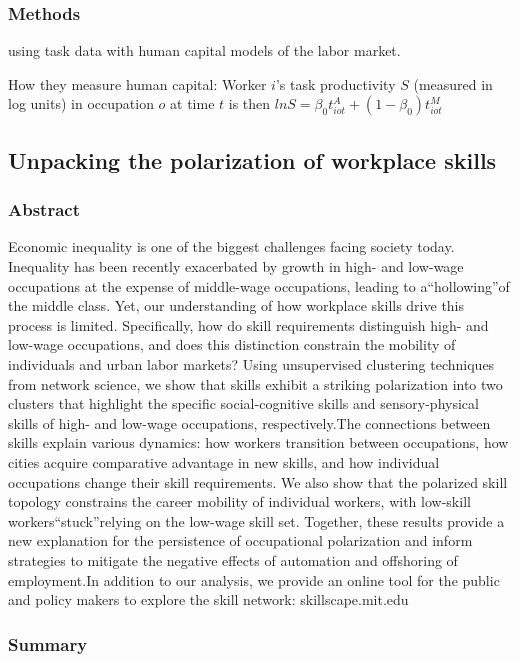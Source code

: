 \documentclass[12pt]{article}
\begin{document}
\subsubsection*{Methods}

using task data with human capital models of the labor market.

How they measure human capital:  Worker $i$'s task productivity $S$ (measured in log units) in occupation $o$ at time $t$ is then $ln{S} = \beta_0t^{A}_{iot} + (1-\beta_0)t^M_{iot}$



\subsection*{Unpacking the polarization of workplace skills\cite{unpacking_the_polarization}}

\subsubsection*{Abstract}
Economic inequality is one of the biggest challenges facing society today. Inequality has been recently exacerbated by growth in high- and low-wage occupations at the expense of middle-wage occupations, leading to a“hollowing”of the middle class. Yet, our understanding of how workplace skills drive this process is limited. Specifically, how do skill requirements distinguish high- and low-wage occupations, and does this distinction constrain the mobility of individuals and urban labor markets? Using unsupervised clustering techniques from network science, we show that skills exhibit a striking polarization into two clusters that highlight the specific social-cognitive skills and sensory-physical skills of high- and low-wage occupations, respectively.The connections between skills explain various dynamics: how workers transition between occupations, how cities acquire comparative advantage in new skills, and how individual occupations change their skill requirements. We also show that the polarized skill topology constrains the career mobility of individual workers, with low-skill workers“stuck”relying on the low-wage skill set. Together, these results provide a new explanation for the persistence of occupational polarization and inform strategies to mitigate the negative effects of automation and offshoring of employment.In addition to our analysis, we provide an online tool for the public and policy makers to explore the skill network: skillscape.mit.edu
\subsubsection*{Summary}
\end{document}
